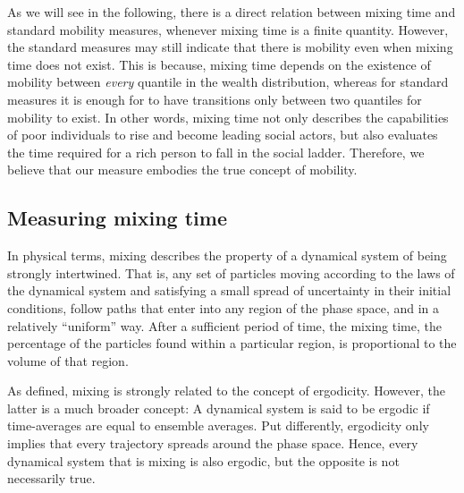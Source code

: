 \documentclass[11pt]{article}
\numberwithin{equation}{section}
\begin{document}
As we will see in the following, there is a direct relation between mixing time and standard mobility measures, whenever mixing time is a finite quantity. However, the standard measures may still indicate that there is mobility even when mixing time does not exist. This is because,  mixing time depends on the existence of mobility between \textit{every} quantile in the wealth distribution, whereas for standard measures it is enough for to have transitions only between two quantiles for mobility to exist. In other words, mixing time not only describes the capabilities of poor individuals to rise and become leading social actors, but also evaluates the time required for a rich person to fall in the social ladder. Therefore, we believe that our measure embodies the true concept of mobility.

\subsection{Measuring mixing time}

In physical terms, mixing describes the property of a dynamical system of being strongly intertwined. That is, any set of particles moving according to the laws of the dynamical system and satisfying a small spread of uncertainty in their initial conditions, follow paths that enter into any region of the phase space, and in a relatively ``uniform'' way. After a sufficient period of time, the mixing time, the percentage of the particles found within a particular region, is proportional to the volume of that region. 

As defined, mixing is strongly related to the concept of ergodicity. However, the latter is a much broader concept: A dynamical system is said to be ergodic if time-averages are equal to ensemble averages. Put differently, ergodicity only implies that every trajectory spreads around the phase space. Hence, every dynamical system that is mixing is also ergodic, but the opposite is not necessarily true.
\end{document}
